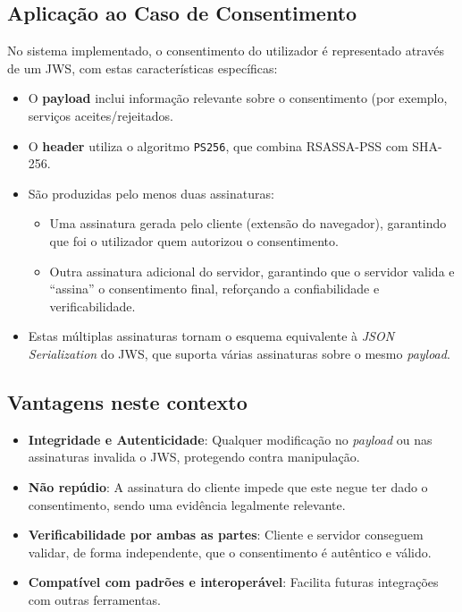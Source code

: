 \subsection{Aplicação ao Caso de Consentimento}

No sistema implementado, o consentimento do utilizador é representado através de um JWS, com estas características específicas:

\begin{itemize}
  \item O \textbf{payload} inclui informação relevante sobre o consentimento (por exemplo, serviços aceites/rejeitados.
  \item O \textbf{header} utiliza o algoritmo \texttt{PS256}, que combina RSASSA-PSS com SHA-256.
  \item São produzidas pelo menos duas assinaturas:
    \begin{itemize}
      \item Uma assinatura gerada pelo cliente (extensão do navegador), garantindo que foi o utilizador quem autorizou o consentimento.
      \item Outra assinatura adicional do servidor, garantindo que o servidor valida e “assina” o consentimento final, reforçando a confiabilidade e verificabilidade.
    \end{itemize}
  \item Estas múltiplas assinaturas tornam o esquema equivalente à \textit{JSON Serialization} do JWS, que suporta várias assinaturas sobre o mesmo \textit{payload}.
\end{itemize}

\subsection{Vantagens neste contexto}

\begin{itemize}
  \item \textbf{Integridade e Autenticidade}: Qualquer modificação no \textit{payload} ou nas assinaturas invalida o JWS, protegendo contra manipulação.
  \item \textbf{Não repúdio}: A assinatura do cliente impede que este negue ter dado o consentimento, sendo uma evidência legalmente relevante.
  \item \textbf{Verificabilidade por ambas as partes}: Cliente e servidor conseguem validar, de forma independente, que o consentimento é autêntico e válido.
  \item \textbf{Compatível com padrões e interoperável}: Facilita futuras integrações com outras ferramentas.
\end{itemize}

